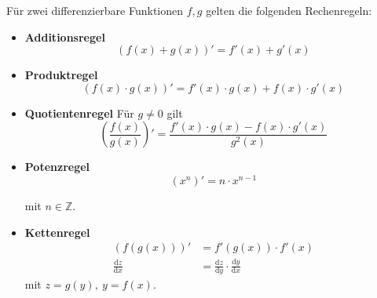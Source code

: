 \documentclass{article}
\newcommand{\diff}{\mathrm{d}}
\newcommand{\lr}[1]{\left(#1\right)}
\begin{document}
Für zwei differenzierbare Funktionen $f,g$ gelten die folgenden Rechenregeln:
\begin{itemize}
	\item \textbf{Additionsregel}
		\begin{equation}
			(f(x) + g(x))' = f'(x) + g'(x)
		\end{equation}
	
	
	\item \textbf{Produktregel}
		\begin{equation}
			(f(x) \cdot g(x))' = f'(x) \cdot g(x) + f(x) \cdot g'(x)
		\end{equation}
		
	
	\item \textbf{Quotientenregel}
	Für $g\neq 0$ gilt
		\begin{equation}
			\lr{ \frac{f(x) }{ g(x)} }' = \frac{ f'(x) \cdot g(x) - f(x) \cdot g'(x) }{ g^2(x) }
		\end{equation}
		
	
	\item \textbf{Potenzregel}
		\begin{equation}
			(x^n)' = n \cdot x^{n-1}
		\end{equation}
	
	mit $n \in \mathbb{Z}$.
		
	
	\item \textbf{Kettenregel}
		\begin{align}
			(f(g(x)))' &= f'(g(x)) \cdot f'(x) \\
			\frac{\diff z}{\diff x} &= \frac{\diff z}{\diff y}\cdot \frac{\diff y}{\diff x}
		\end{align}
		mit $z = g(y),\ y = f(x)$.
\end{itemize}

\vspace{0.5cm}
\end{document}
